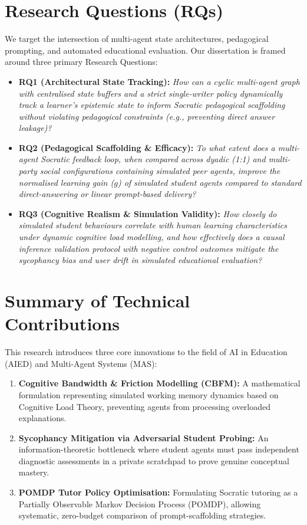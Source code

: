\section{Research Questions (RQs)}
We target the intersection of multi-agent state architectures, pedagogical prompting, and automated educational evaluation. Our dissertation is framed around three primary Research Questions:
\begin{itemize}
    \item \textbf{RQ1 (Architectural State Tracking):} \textit{How can a cyclic multi-agent graph with centralised state buffers and a strict single-writer policy dynamically track a learner's epistemic state to inform Socratic pedagogical scaffolding without violating pedagogical constraints (e.g., preventing direct answer leakage)?}
    \item \textbf{RQ2 (Pedagogical Scaffolding \& Efficacy):} \textit{To what extent does a multi-agent Socratic feedback loop, when compared across dyadic (1:1) and multi-party social configurations containing simulated peer agents, improve the normalised learning gain ($g$) of simulated student agents compared to standard direct-answering or linear prompt-based delivery?}
    \item \textbf{RQ3 (Cognitive Realism \& Simulation Validity):} \textit{How closely do simulated student behaviours correlate with human learning characteristics under dynamic cognitive load modelling, and how effectively does a causal inference validation protocol with negative control outcomes mitigate the sycophancy bias and user drift in simulated educational evaluation?}
\end{itemize}

\section{Summary of Technical Contributions}
This research introduces three core innovations to the field of AI in Education (AIED) and Multi-Agent Systems (MAS):
\begin{enumerate}
    \item \textbf{Cognitive Bandwidth \& Friction Modelling (CBFM):} A mathematical formulation representing simulated working memory dynamics based on Cognitive Load Theory, preventing agents from processing overloaded explanations.
    \item \textbf{Sycophancy Mitigation via Adversarial Student Probing:} An information-theoretic bottleneck where student agents must pass independent diagnostic assessments in a private scratchpad to prove genuine conceptual mastery.
    \item \textbf{POMDP Tutor Policy Optimisation:} Formulating Socratic tutoring as a Partially Observable Markov Decision Process (POMDP), allowing systematic, zero-budget comparison of prompt-scaffolding strategies.
\end{enumerate}
